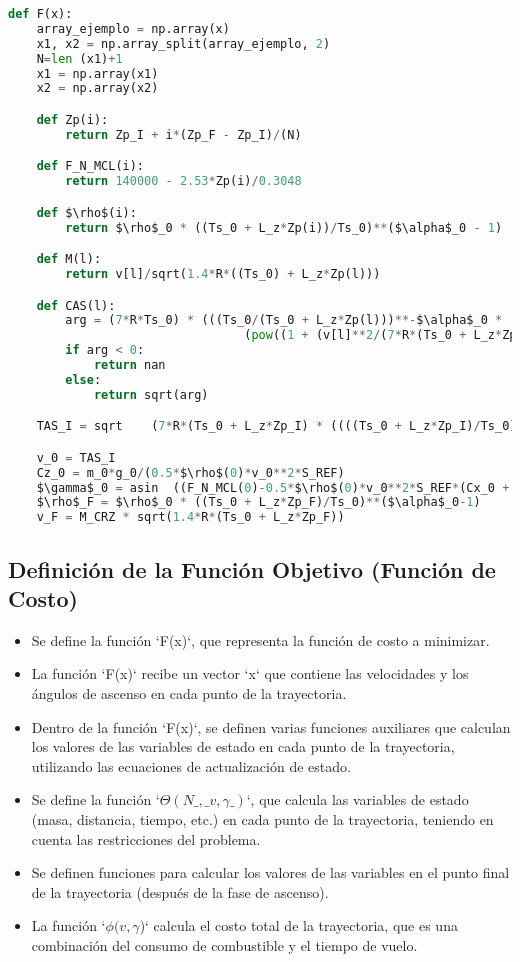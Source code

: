 \documentclass[fleqn]{article}
\begin{document}
\begin{lstlisting}[language=Python, firstnumber=last, style = mystyle, mathescape=true]
def F(x):
    array_ejemplo = np.array(x)
    x1, x2 = np.array_split(array_ejemplo, 2)
    N=len (x1)+1
    x1 = np.array(x1)
    x2 = np.array(x2)

    def Zp(i): 
        return Zp_I + i*(Zp_F - Zp_I)/(N)

    def F_N_MCL(i):   
        return 140000 - 2.53*Zp(i)/0.3048 

    def $\rho$(i):
        return $\rho$_0 * ((Ts_0 + L_z*Zp(i))/Ts_0)**($\alpha$_0 - 1) 

    def M(l): 
        return v[l]/sqrt(1.4*R*((Ts_0) + L_z*Zp(l)))

    def CAS(l): 
        arg = (7*R*Ts_0) * (((Ts_0/(Ts_0 + L_z*Zp(l)))**-$\alpha$_0 *
                                 (pow((1 + (v[l]**2/(7*R*(Ts_0 + L_z*Zp(l))))),3.5) - 1) + 1)**(1/3.5) - 1)
        if arg < 0:
            return nan
        else:
            return sqrt(arg)

    TAS_I = sqrt    (7*R*(Ts_0 + L_z*Zp_I) * ((((Ts_0 + L_z*Zp_I)/Ts_0)**-$\alpha$_0 * ((1 + CAS_I**2/(7*R*Ts_0))**3.5 - 1) + 1)**(1/3.5) - 1))

    v_0 = TAS_I
    Cz_0 = m_0*g_0/(0.5*$\rho$(0)*v_0**2*S_REF) 
    $\gamma$_0 = asin  ((F_N_MCL(0)-0.5*$\rho$(0)*v_0**2*S_REF*(Cx_0 + k*Cz_0))/(m_0*g_0))
    $\rho$_F = $\rho$_0 * ((Ts_0 + L_z*Zp_F)/Ts_0)**($\alpha$_0-1)
    v_F = M_CRZ * sqrt(1.4*R*(Ts_0 + L_z*Zp_F)) 
\end{lstlisting}


\subsection{Definición de la Función Objetivo (Función de Costo)}

\begin{itemize}
    \item Se define la función `F(x)`, que representa la función de costo a minimizar.
    \item La función `F(x)` recibe un vector `x` que contiene las velocidades y los ángulos de ascenso en cada punto de la trayectoria.
    \item Dentro de la función `F(x)`, se definen varias funciones auxiliares que calculan los valores de las variables de estado en cada punto de la trayectoria, utilizando las ecuaciones de actualización de estado.
    \item Se define la función `$\Theta(N\_,\_v,\gamma\_)$`, que calcula las variables de estado (masa, distancia, tiempo, etc.) en cada punto de la trayectoria, teniendo en cuenta las restricciones del problema.
    \item Se definen funciones para calcular los valores de las variables en el punto final de la trayectoria (después de la fase de ascenso).
    \item La función `$\phi(v,\gamma$)` calcula el costo total de la trayectoria, que es una combinación del consumo de combustible y el tiempo de vuelo.
\end{itemize}
\end{document}
